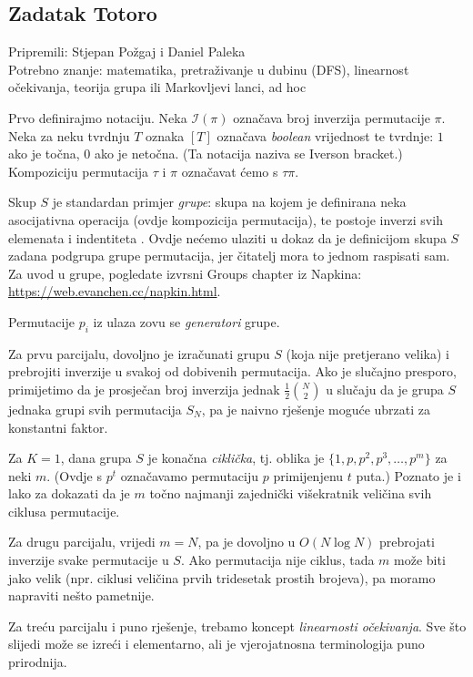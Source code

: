 \newcommand\EE{\mathbb E}
\newcommand\PP{\mathbb P}
\newcommand\II{\mathcal I}

\subsection*{Zadatak Totoro}
\textsf{Pripremili: Stjepan Požgaj i Daniel Paleka}\\
\textsf{Potrebno znanje: matematika, pretraživanje u dubinu (DFS), 
linearnost očekivanja, teorija grupa ili Markovljevi lanci, ad hoc }

Prvo definirajmo notaciju.
Neka $\II(\pi)$ označava broj inverzija permutacije $\pi$.
Neka za neku tvrdnju $T$ oznaka $[T]$ označava \textit{boolean} vrijednost
te tvrdnje: $1$ ako je točna, $0$ ako je netočna. (Ta notacija naziva se 
Iverson bracket.) Kompoziciju permutacija $\tau$ i $\pi$ označavat ćemo s
$\tau \pi$.

Skup $S$ je standardan primjer \textit{grupe}: skupa na kojem je definirana
neka asocijativna operacija (ovdje kompozicija permutacija), te postoje
inverzi svih elemenata i indentiteta .
Ovdje nećemo ulaziti u dokaz da je definicijom skupa $S$ zadana podgrupa
grupe permutacija, jer čitatelj mora to jednom raspisati sam.
Za uvod u grupe, pogledate izvrsni Groups chapter iz Napkina:
\url{https://web.evanchen.cc/napkin.html}.

Permutacije $p_i$ iz ulaza zovu se \textit{generatori} grupe.

Za prvu parcijalu, dovoljno je izračunati grupu $S$ (koja nije 
pretjerano velika) i prebrojiti inverzije u svakoj
od dobivenih permutacija. Ako je slučajno presporo, 
primijetimo da je prosječan broj inverzija
jednak $\frac{1}{2} \binom{N}{2}$
u slučaju da je grupa $S$ jednaka grupi svih permutacija $S_N$,
pa je naivno rješenje moguće ubrzati za konstantni faktor.

Za $K = 1$, dana grupa $S$ je konačna \textit{ciklička}, 
tj. oblika je $\{ 1, p, p^2, p^3, \ldots, p^m \}$ za neki $m$.
(Ovdje s $p^t$ označavamo permutaciju $p$ primijenjenu $t$ puta.)
Poznato je i lako za dokazati da je $m$ točno najmanji
zajednički višekratnik veličina svih ciklusa permutacije.

Za drugu parcijalu, vrijedi $m = N$, pa je dovoljno u $O(N \log N)$
prebrojati inverzije svake permutacije u $S$. 
Ako permutacija nije ciklus, tada $m$ može biti jako velik
(npr. ciklusi veličina prvih tridesetak prostih brojeva), 
pa moramo napraviti nešto pametnije.

Za treću parcijalu i puno rješenje, trebamo koncept \textit{linearnosti
očekivanja}. Sve što slijedi može se izreći i elementarno,
ali je vjerojatnosna terminologija puno prirodnija.


